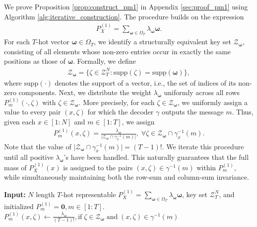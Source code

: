 \documentclass[11pt,letterpaper]{article}
\newcommand{\supp}{\mathrm{supp}}
\newcommand{\cZ}{\mathcal{Z}}
\begin{document}
We prove Proposition \ref{prop:construct_pm1} in Appendix \ref{sec:proof_pm1} using Algorithm \ref{alg:iterative_construction}. The procedure builds on the expression
\begin{align}
    P_X^{(1)} = \sum_{\boldsymbol{\omega} \in \Omega_T} \lambda_{\boldsymbol{\omega}}\boldsymbol{\omega}.
\end{align}
For each $T$-hot vector $\boldsymbol{\omega} \in \Omega_T$, we identify a structurally equivalent key set $\cZ_{\boldsymbol{\omega}}$, consisting of all elements whose non-zero entries occur in exactly the same positions as those of $\boldsymbol{\omega}$. Formally, we define
\begin{align}
    \cZ_{\boldsymbol{\omega}} = \{\zeta \in \cZ^N_T : \supp(\zeta) = \supp(\boldsymbol{\omega}) \},
\end{align}
where $\supp(\cdot)$ denotes the support of a vector, i.e., the set of indices of its non-zero components. 
Next, we distribute the weight $\lambda_{\boldsymbol{\omega}}$ uniformly across all rows $P_m^{(1)}(\cdot, \zeta)$ with $\zeta \in \cZ_{\boldsymbol{\omega}}$. More precisely, for each $\zeta \in \cZ_{\boldsymbol{\omega}}$, we uniformly assign a value to every pair $(x,\zeta)$ for which the decoder $\gamma$ outputs the message $m$. Thus, given each $x \in [1:N]$ and $m \in [1:T]$, we assign
\begin{align}
    P_m^{(1)}(x,\zeta) =  \frac{\lambda_{\boldsymbol{\omega}}}{\bigl|\cZ_{\boldsymbol{\omega}} \cap \gamma_x^{-1}(m)\bigr|}, \; \forall \zeta \in \cZ_{\boldsymbol{\omega}} \cap \gamma_x^{-1}(m).
\end{align}
Note that the value of $|\cZ_{\boldsymbol{\omega}} \cap \gamma_x^{-1}(m)\bigr| = (T-1)!$. 
We iterate this procedure until all positive $\lambda_{\boldsymbol{\omega}}$'s have been handled. This naturally guarantees that the full mass of $P_X^{(1)}(x)$ is assigned to the pairs $(x,\zeta) \in \gamma^{-1}(m)$ within $P_m^{(1)}$, while simultaneously maintaining both the row-sum and column-sum invariance. 

\begin{algorithm}[h]
\caption{$P_m^{(1)}$: Structural-Basis via $T$-hot Representative}
\label{alg:iterative_construction}
\begin{algorithmic}[1]
\State \textbf{Input:} $N$ length $T$-hot representable $P_X^{(1)} = \sum_{\boldsymbol{\omega} \in \Omega_T} \lambda_{\boldsymbol{\omega}}\boldsymbol{\omega}$, key set $\cZ^N_T$, and initialized $P_m^{(1)} = \mathbf{0}, m \in [1:T]$.
    \State $P^{(1)}_m(x, \zeta) \gets \frac{\lambda_{\boldsymbol{\omega}}}{(T-1)!}, \text{if} \; \zeta \in \cZ_{\boldsymbol{\omega}} \; \text{and}\; (x,\zeta) \in \gamma^{-1}(m)$
\EndFor
\end{algorithmic}
\end{algorithm}
\end{document}
